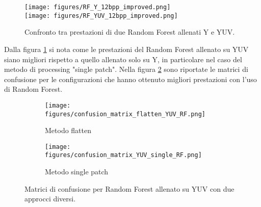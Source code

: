 \begin{figure}[H]
    \centering
    \texttt{[image: figures/RF\_Y\_12bpp\_improved.png]}\\[0.5cm]
    \texttt{[image: figures/RF\_YUV\_12bpp\_improved.png]}
    \caption{Confronto tra prestazioni di due Random Forest allenati Y e YUV.}
    \label{fig:RF_YvsYUV}
\end{figure}
Dalla figura \ref{fig:RF_YvsYUV} si nota come le prestazioni del Random Forest allenato su YUV siano  migliori rispetto a quello allenato solo su Y, in particolare nel caso del metodo di processing "single patch".
Nella figura \ref{fig:RF_YUV_confusion} sono riportate le matrici di confusione per le configurazioni che hanno ottenuto migliori prestazioni con l'uso di Random Forest.
\begin{figure}[H]
    \centering
    \begin{subfigure}[b]{0.7\textwidth}
        \centering
        \texttt{[image: figures/confusion\_matrix\_flatten\_YUV\_RF.png]}
        \caption{Metodo flatten}
    \end{subfigure}
    \hfill
    \begin{subfigure}[b]{0.7\textwidth}
        \centering
        \texttt{[image: figures/confusion\_matrix\_YUV\_single\_RF.png]}
        \caption{Metodo single patch}
    \end{subfigure}
    \caption{Matrici di confusione per Random Forest allenato su YUV con due approcci diversi.}
    \label{fig:RF_YUV_confusion}
\end{figure}

